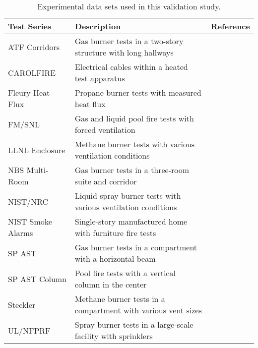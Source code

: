 \begin{table}[!ht]
\caption[Experimental data sets used in this validation study]
{Experimental data sets used in this validation study.}

\begin{center}
\begin{tabular}{|l|l|c|}
\hline
Test Series           &  Description                                                    &  Reference                                  \\ \hline \hline
ATF Corridors         &  Gas burner tests in a two-story structure with long hallways   &  \cite{Sheppard:Corridors}                  \\ \hline
CAROLFIRE             &  Electrical cables within a heated test apparatus               &  \cite{CAROLFIRE}                           \\ \hline
Fleury Heat Flux      &  Propane burner tests with measured heat flux                   &  \cite{Fleury:Masters}                      \\ \hline
FM/SNL                &  Gas and liquid pool fire tests with forced ventilation         &  \cite{Nowlen:NUREG4681, Nowlen:NUREG4527}  \\ \hline
LLNL Enclosure        &  Methane burner tests with various ventilation conditions       &  \cite{Foote:LLNL1986}                      \\ \hline
NBS Multi-Room        &  Gas burner tests in a three-room suite and corridor            &  \cite{Peacock:NBS_Multi-Room}              \\ \hline
NIST/NRC              &  Liquid spray burner tests with various ventilation conditions  &  \cite{Hamins:SP1013-1}                     \\ \hline
NIST Smoke Alarms     &  Single-story manufactured home with furniture fire tests       &  \cite{Bukowski:1}                          \\ \hline
SP AST                &  Gas burner tests in a compartment with a horizontal beam       &  \cite{Wickstrom_AST}                       \\ \hline
SP AST Column         &  Pool fire tests with a vertical column in the center           &  \cite{Sjostrom:AST}                        \\ \hline
Steckler              &  Methane burner tests in a compartment with various vent sizes  &  \cite{Steckler:NBSIR_82-2520}              \\ \hline
UL/NFPRF              &  Spray burner tests in a large-scale facility with sprinklers   &  \cite{Sheppard:1, McGrattan:5}             \\ \hline

\end{tabular}
\end{center}
\end{table}
